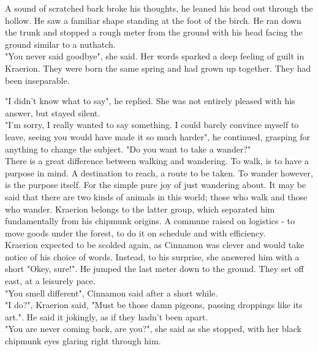 \documentclass[smalldemyvopaper,11pt,twoside,onecolumn,openright,extrafontsizes]{memoir}
\newlength\drop
\begin{document}
A sound of scratched bark broke his thoughts, he leaned his head out through the hollow. He saw a familiar shape standing at the foot of the birch. He ran down the trunk and stopped a rough meter from the ground with his head facing the ground similar to a nuthatch.\\

"You never said goodbye", she said. Her words sparked a deep feeling of guilt in Kraerion. They were born the same spring and had grown up together. They had been inseparable. 

"I didn't know what to say", he replied. She was not entirely pleased with his answer, but stayed silent.\\

"I'm sorry, I really wanted to say something. I could barely convince myself to leave, seeing you would have made it so much harder", he continued, grasping for anything to change the subject. "Do you want to take a wander?" \\ 


There is a great difference between walking and wandering. To walk, is to have a purpose in mind. A destination to reach, a route to be taken. To wander however, is the purpose itself. For the simple pure joy of just wandering about. It may be said that there are two kinds of animals in this world; those who walk and those who wander. Kraerion belongs to the latter group, which separated him fundamentally from his chipmunk origins. A commune raised on logistics - to move goods under the forest, to do it on schedule and with efficiency. \\

Kraerion expected to be scolded again, as Cinnamon was clever and would take notice of his choice of words. Instead, to his surprise, she answered him with a short "Okey, sure!". He jumped the last meter down to the ground. They set off east, at a leisurely pace. \\

"You smell different", Cinnamon said after a short while.\\

"I do?", Kraerion said, "Must be those damn pigeons, passing droppings like its art.". He said it jokingly, as if they hadn't been apart. \\

"You are never coming back, are you?", she said as she stopped, with her black chipmunk eyes glaring right through him. \\
\end{document}
